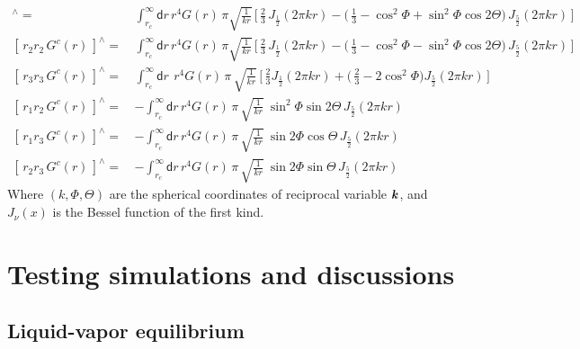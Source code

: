 \documentclass[aps,pre,preprint]{revtex4}
\renewcommand{\v}[1]{\textbf{\textit{#1}}}
\renewcommand{\d}[1]{\textsf{#1}}
\begin{document}
\begin{align}
  [\,r_1r_1\,G^c(r)\,]^{\wedge} 
  =\,& 
  \int_{r_c}^\infty \d dr\, r^4 G(r)\,
  \pi \sqrt{ \frac1{kr} }\,
  \Big[\,
  \frac23\,J_{\frac12}(2\pi kr) -
  \big(\,
  \frac13 -
  \cos^2\Phi +
  \sin^2\Phi\cos2\Theta
  \big)\, J_{\frac52}(2\pi kr)
  \,\Big] \\
  [\,r_2 r_2\,G^c(r)\,]^{\wedge} 
  =\,& 
  \int_{r_c}^\infty \d dr\, r^4 G(r)\,
  \pi \sqrt{ \frac1{kr} }\,
  \Big[\,
  \frac23\,J_{\frac12}(2\pi kr) -
  \big(\,
  \frac13 -
  \cos^2\Phi -
  \sin^2\Phi\cos2\Theta
  \big)\, J_{\frac52}(2\pi kr)
  \,\Big]   \\
  [\,r_3 r_3\,G^c(r)\,]^{\wedge} 
  =\,& 
  \int_{r_c}^\infty \d dr\: \,r^4 G(r)\,\pi\,
  \sqrt{ \frac1{kr} }\,
  \Big[\,
  \frac23 J_{\frac12}(2\pi kr) +
  \big(\,
  \frac23 - 2\cos^2\Phi
  \big)
  J_{\frac52}(2\pi kr)
  \,\Big]\\
  [\,r_1 r_2\,G^c(r)\,]^{\wedge} 
  =\,& -
  \int_{r_c}^\infty
  \d dr\,
  r^4G(r)\,\pi\,
  \sqrt{\frac1{kr}}\:
  \sin^2\Phi\sin 2\Theta\,J_{\frac52}(2\pi kr)\\
  [\,r_1 r_3\,G^c(r)\,]^{\wedge} 
  =\,& -
  \int_{r_c}^\infty
  \d dr\,
  r^4G(r)\,\pi\,
  \sqrt{\frac1{kr}}\:
  \sin2\Phi\cos\Theta\,J_{\frac52}(2\pi kr)\\
  [\,r_2 r_3\,G^c(r)\,]^{\wedge} 
  =\,& -
  \int_{r_c}^\infty
  \d dr\,
  r^4G(r)\,\pi\,
  \sqrt{\frac1{kr}}\:
  \sin2\Phi\sin\Theta\,J_{\frac52}(2\pi kr)
\end{align}
Where $(k, \Phi, \Theta)$ are the spherical coordinates of reciprocal
variable $\v k$, and $J_\nu(x)$ is the Bessel function of the first
kind.



\section{Testing simulations and discussions}\label{sec:tmp2}

\subsection{Liquid-vapor equilibrium}\label{sec:tmp2.1}
\end{document}
